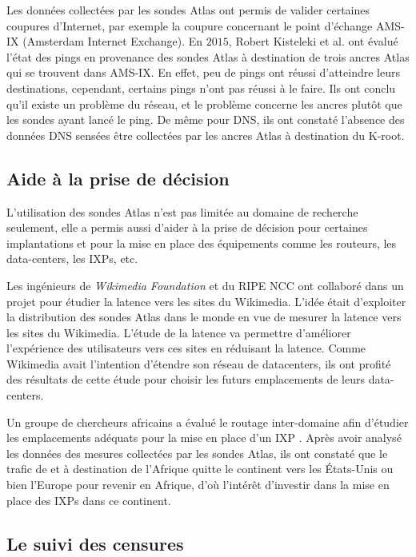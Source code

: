 Les données collectées par les sondes Atlas ont permis de valider certaines coupures d'Internet, par exemple la coupure concernant le point d'échange AMS-IX (Amsterdam Internet Exchange). En $2015$, Robert Kisteleki  et al. \cite{Robert-Kisteleki}  ont évalué l'état des pings en provenance des sondes Atlas à destination de trois ancres Atlas qui se trouvent dans AMS-IX. En effet, peu de pings ont réussi d'atteindre leurs destinations, cependant, certains pings n'ont pas réussi à le faire. Ils ont conclu qu'il existe un problème du réseau, et le problème concerne  les ancres plutôt que les sondes ayant lancé le ping. De même pour DNS, ils ont constaté l'absence des données DNS sensées être collectées par les ancres Atlas à destination du K-root.






\subsection{Aide à la prise de décision}
L'utilisation des sondes Atlas n'est pas limitée au domaine de recherche seulement, elle a permis aussi d'aider à la prise de décision pour certaines implantations et pour la mise en place des équipements comme les routeurs, les data-centers, les IXPs, etc. 

Les ingénieurs de \textit{Wikimedia Foundation} et du RIPE NCC ont collaboré dans un projet \cite{Wikipedia} pour étudier la  latence vers les sites  du Wikimedia. L'idée était d'exploiter la distribution des sondes  Atlas dans le monde en vue  de mesurer la latence vers les sites du Wikimedia. L'étude de la latence va permettre d'améliorer l'expérience des utilisateurs vers ces sites  en réduisant la latence. Comme Wikimedia avait l'intention d'étendre son réseau de datacenters, ils ont profité des résultats de cette étude pour choisir les futurs emplacements de leurs data-centers.


Un groupe de chercheurs africains a évalué le routage inter-domaine afin d'étudier les emplacements adéquats pour la mise en place d'un IXP \cite{FANOU-Roderick}. Après avoir analysé les données des mesures collectées par les sondes Atlas, ils ont constaté que le trafic de et à destination de l'Afrique quitte le continent vers les États-Unis ou bien  l'Europe pour revenir en Afrique, d'où l'intérêt d'investir dans la mise en place des IXPs dans ce continent.  \par


\subsection{Le suivi des censures}

